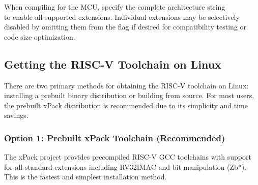 \documentclass[11pt,pdftex,portrait,letterpaper]{article}
\begin{document}
When compiling for the \AsicNameForUserGuide{} MCU, specify the complete architecture string \\  to enable all supported extensions. Individual extensions may be selectively disabled by omitting them from the  flag if desired for compatibility testing or code size optimization.

\subsection{Getting the RISC-V Toolchain on Linux} \label{ss:linuxinstall}
There are two primary methods for obtaining the RISC-V toolchain on Linux: installing a prebuilt binary distribution or building from source. For most users, the prebuilt xPack distribution is recommended due to its simplicity and time savings.

\subsubsection{Option 1: Prebuilt xPack Toolchain (Recommended)}

The xPack project provides precompiled RISC-V GCC toolchains with support for all standard extensions including RV32IMAC and bit manipulation (Zb*). This is the fastest and simplest installation method.
\end{document}
